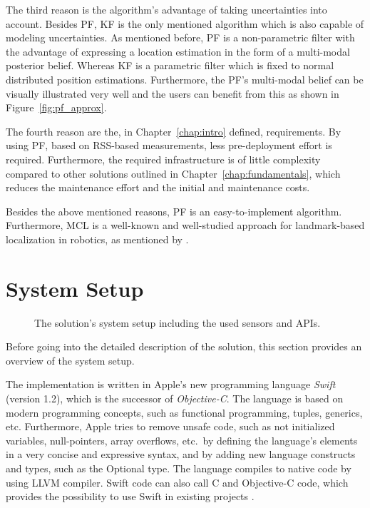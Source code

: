 The third reason is the algorithm's advantage of taking uncertainties into account. Besides \ac{PF}, \ac{KF} is the only mentioned algorithm which is also capable of modeling uncertainties. As mentioned before, \acs{PF} is a non-parametric filter with the advantage of expressing a location estimation in the form of a multi-modal posterior belief. Whereas \ac{KF} is a parametric filter which is fixed to normal distributed position estimations. Furthermore, the \ac{PF}'s multi-modal belief can be visually illustrated very well and the users can benefit from this as shown in Figure~\ref{fig:pf_approx}.

The fourth reason are the, in Chapter~\ref{chap:intro} defined, requirements. By using \acs{PF}, based on \acs{RSS}-based measurements, less pre-deployment effort is required. Furthermore, the required infrastructure is of little complexity compared to other solutions outlined in Chapter~\ref{chap:fundamentals}, which reduces the maintenance effort and the initial and maintenance costs.

Besides the above mentioned reasons, \acl{PF} is an easy-to-implement algorithm. Furthermore, \ac{MCL} is a well-known and well-studied approach for landmark-based localization in robotics, as mentioned by \citet{thrun:prob_robo}.


\section{System Setup}
\begin{figure}[height=0.45\textheight]
	
	\caption{The solution's system setup including the used sensors and \acsp{API}.}
	\label{fig:algo_architecture}
\end{figure}

Before going into the detailed description of the solution, this section provides an overview of the system setup.

The implementation is written in Apple's new programming language \emph{Swift} (version 1.2), which is the successor of \emph{Objective-C}. The language is based on modern programming concepts, such as functional programming, tuples, generics, etc. Furthermore, Apple tries to remove unsafe code, such as not initialized variables, null-pointers, array overflows, etc.\ by defining the language's elements in a very concise and expressive syntax, and by adding new language constructs and types, such as the Optional type. The language compiles to native code by using LLVM compiler. Swift code can also call C and Objective-C code, which provides the possibility to use Swift in existing projects \citep{apple:swift}.

